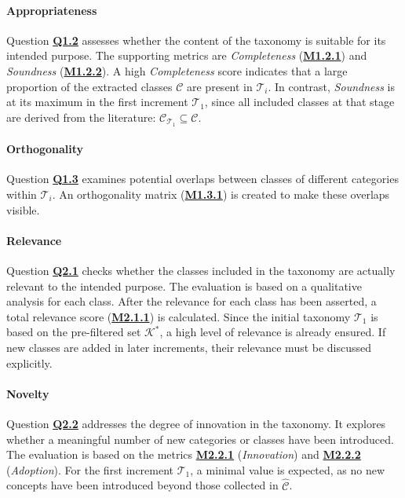 \paragraph{Appropriateness} Question \hyperref[tab:gqm_taxonomy_validation]{\textbf{Q1.2}} assesses whether the content of the taxonomy is suitable for its intended purpose. The supporting metrics are \emph{Completeness} (\hyperref[tab:gqm_taxonomy_validation]{\textbf{M1.2.1}}) and \emph{Soundness} (\hyperref[tab:gqm_taxonomy_validation]{\textbf{M1.2.2}}). A high \emph{Completeness} score indicates that a large proportion of the extracted classes $\mathcal{C}$ are present in $\mathcal{T}_i$. In contrast, \emph{Soundness} is at its maximum in the first increment $\mathcal{T}_1$, since all included classes at that stage are derived from the literature: $\mathcal{C}_{\mathcal{T}_1} \subseteq \mathcal{C}$.

\paragraph{Orthogonality} Question \hyperref[tab:gqm_taxonomy_validation]{\textbf{Q1.3}} examines potential overlaps between classes of different categories within $\mathcal{T}_i$. An orthogonality matrix (\hyperref[tab:gqm_taxonomy_validation]{\textbf{M1.3.1}}) is created to make these overlaps visible.

\paragraph{Relevance} Question \hyperref[tab:gqm_taxonomy_validation]{\textbf{Q2.1}} checks whether the classes included in the taxonomy are actually relevant to the intended purpose. The evaluation is based on a qualitative analysis for each class. After the relevance for each class has been asserted, a total relevance score (\hyperref[tab:gqm_taxonomy_validation]{\textbf{M2.1.1}}) is calculated. Since the initial taxonomy $\mathcal{T}_1$ is based on the pre-filtered set $\mathcal{K}^\ast$, a high level of relevance is already ensured. If new classes are added in later increments, their relevance must be discussed explicitly.

\paragraph{Novelty} Question \hyperref[tab:gqm_taxonomy_validation]{\textbf{Q2.2}} addresses the degree of innovation in the taxonomy. It explores whether a meaningful number of new categories or classes have been introduced. The evaluation is based on the metrics \hyperref[tab:gqm_taxonomy_validation]{\textbf{M2.2.1}} (\emph{Innovation}) and \hyperref[tab:gqm_taxonomy_validation]{\textbf{M2.2.2}} (\emph{Adoption}). For the first increment $\mathcal{T}_1$, a minimal value is expected, as no new concepts have been introduced beyond those collected in $\hat{\mathcal{C}}$.

